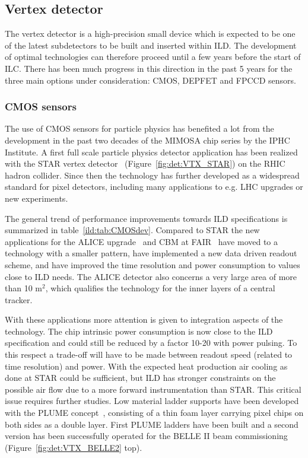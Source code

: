 
\vspace{1.0cm}

\subsection{Vertex detector}

The vertex detector is a high-precision small device which is expected to be one of the latest subdetectors to be built and inserted within ILD. The development of optimal technologies can therefore proceed until a few years before the start of ILC. There has been much progress in this direction in the past 5 years for the three main options under consideration: CMOS, DEPFET and FPCCD sensors.

\subsubsection{CMOS sensors}

The use of CMOS sensors for particle physics has benefited a lot from the development in the past two decades of the MIMOSA chip series by the IPHC Institute. A first full scale particle physics detector application has been realized with the STAR vertex detector~\cite{Contin:2017mck} (Figure~\ref{fig:det:VTX_STAR}) on the RHIC hadron collider. Since then the technology has further developed as a widespread standard for pixel detectors, including many applications to e.g. LHC upgrades or new experiments. 

The general trend of performance improvements towards ILD specifications is summarized in table~\ref{ild:tab:CMOSdev}. Compared to STAR the new applications for the ALICE upgrade~\cite{AglieriRinella:2017lym} and CBM at FAIR~\cite{Koziel:2017loo} have moved to a technology with a smaller pattern, have implemented a new data driven readout scheme, and have improved the time resolution and power consumption to values close to ILD needs. The ALICE detector also concerns a very large area of more than 10 m$^2$, which qualifies the technology for the inner layers of a central tracker.

With these applications more attention is given to integration aspects of the technology. The chip intrinsic power consumption is now close to the ILD specification and could still be reduced by a factor 10-20 with power pulsing. To this respect a trade-off will have to be made between readout speed (related to time resolution) and power. With the expected heat production air cooling as done at STAR could be sufficient, but ILD has stronger constraints on the possible air flow due to a more forward instrumentation than STAR. This critical issue requires further studies. Low material ladder supports have been developed with the PLUME concept~\cite{Nomerotski:2011zz}, consisting of a thin foam layer carrying pixel chips on both sides as a double layer. First PLUME ladders have been built and a second version has been successfully operated for the BELLE II beam commissioning (Figure~\ref{fig:det:VTX_BELLE2} top).

